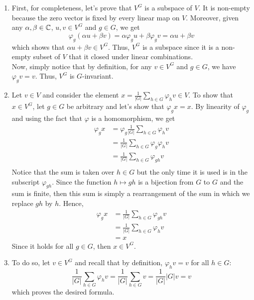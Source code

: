 \begin{solution}
    \begin{enumerate}
        \item First, for completeness, let's prove that $V^G$ is a subspace of $V$. It is non-empty because the zero vector is fixed by every linear map on $V$. Moreover, given any $\alpha, \beta \in \mathbb{C}$, $u,v \in V^G$ and $g \in G$, we get
        $$\varphi_g(\alpha u + \beta v) = \alpha \varphi_g u + \beta \varphi_g v = \alpha u + \beta v$$
        which shows that $\alpha u + \beta v \in V^G$. Thus, $V^G$ is a subspace since it is a non-empty subset of $V$ that it closed under linear combinations. \\
        Now, simply notice that by definition, for any $v \in V^G$ and $g \in G$, we have $\varphi_g v = v$. Thus, $V^G$ is $G$-invariant.
        \item Let $v \in V$ and consider the element $x = \frac{1}{|G|}\sum_{h \in G}\varphi_h v \in V$. To show that $x \in V^G$, let $g \in G$ be arbitrary and let's show that $\varphi_g x = x$. By linearity of $\varphi_g$ and using the fact that $\varphi$ is a homomorphism, we get
        \begin{align*}
            \varphi_g x &= \varphi_g \frac{1}{|G|}\sum_{h \in G}\varphi_h v \\
            &= \frac{1}{|G|}\sum_{h \in G}\varphi_g \varphi_h v \\
            &= \frac{1}{|G|}\sum_{h \in G}\varphi_{gh} v \\
        \end{align*} 
        Notice that the sum is taken over $h \in G$ but the only time it is used is in the subscript $\varphi_{gh}$. Since the function $h \mapsto gh$ is a bijection from $G$ to $G$ and the sum is finite, then this sum is simply a rearrangement of the sum in which we replace $gh$ by $h$. Hence,
        \begin{align*}
            \varphi_g x &= \frac{1}{|G|}\sum_{h \in G}\varphi_{gh} v \\
            &= \frac{1}{|G|}\sum_{h \in G}\varphi_{h} v \\
            &= x
        \end{align*}
        Since it holds for all $g \in G$, then $x \in V^G$.
        \item To do so, let $v \in V^G$ and recall that by definition, $\varphi_h v = v$ for all $h \in G$:
        $$\frac{1}{|G|}\sum_{h \in G}\varphi_h v = \frac{1}{|G|}\sum_{h \in G} v = \frac{1}{|G|} |G| v = v$$
        which proves the desired formula.

\end{enumerate}
\end{solution}
